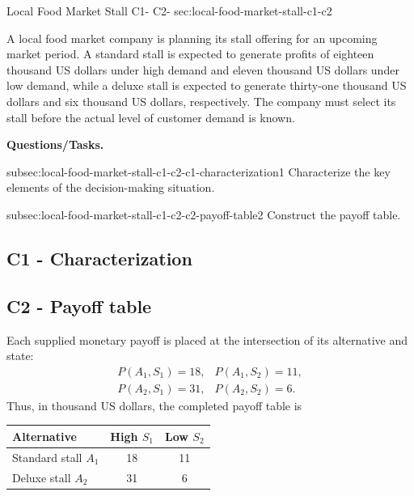	\sectionScored
	{Local Food Market Stall}
	{C1- \hspace{2mm} C2-}
	{sec:local-food-market-stall-c1-c2}
	{
		A local food market company is planning its stall offering for an upcoming market period. A standard stall is expected to generate profits of eighteen thousand US dollars under high demand and eleven thousand US dollars under low demand, while a deluxe stall is expected to generate thirty-one thousand US dollars and six thousand US dollars, respectively. The company must select its stall before the actual level of customer demand is known.
		
		\textbf{Questions/Tasks.}
		\begin{enumerate}
			\CriterionTask
			{subsec:local-food-market-stall-c1-c2-c1-characterization}{1}
			{Characterize the key elements of the decision-making situation. }
			
			\CriterionTask
			{subsec:local-food-market-stall-c1-c2-c2-payoff-table}{2}
			{Construct the payoff table. }
		\end{enumerate}
		
		\label{subsec:local-food-market-stall-c1-c2-c1-characterization}
		\subsection*{C1 - Characterization }
		
		
		\label{subsec:local-food-market-stall-c1-c2-c2-payoff-table}
		\subsection*{C2 - Payoff table }
		
		Each supplied monetary payoff is placed at the intersection of its alternative and state:
		\[
		\begin{array}{ll}
			P(A_1,S_1)=18, & P(A_1,S_2)=11,\\
			P(A_2,S_1)=31, & P(A_2,S_2)=6.
		\end{array}
		\]
		Thus, in thousand US dollars, the completed payoff table is
		\begin{center}
			\begin{tabular}{lcc}
				\toprule
				Alternative & High \(S_1\) & Low \(S_2\)\\
				\midrule
				Standard stall \(A_1\) & 18 & 11\\
				Deluxe stall \(A_2\) & 31 & 6\\
				\bottomrule
			\end{tabular}
		\end{center}
		
		\vspace{-5mm}
		
	}
	
